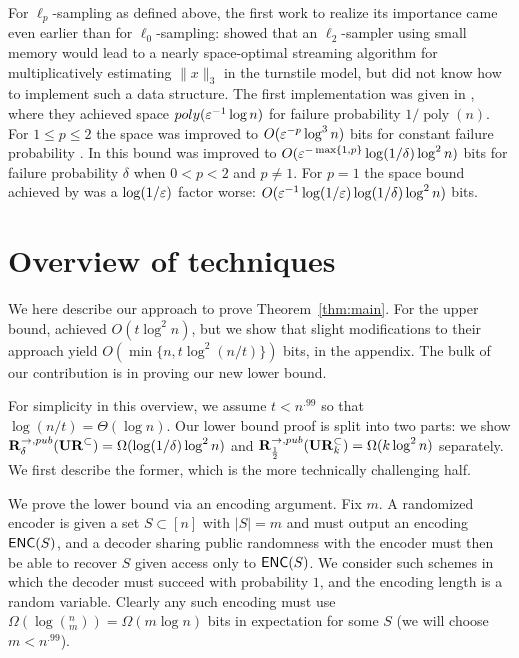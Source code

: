 For $\ell_p$-sampling as defined above, the first work to realize its importance came even earlier than for $\ell_0$-sampling: \cite{CoppersmithK04} showed that an $\ell_2$-sampler using small memory would lead to a nearly space-optimal streaming algorithm for multiplicatively estimating $\|x\|_3$ in the turnstile model, but did not know how to implement such a data structure. The first implementation was given in \cite{MonemizadehW10}, where they achieved space $\mathop{poly}(\varepsilon^{-1}\log n)$ for failure probability $1/\mathop{poly}(n)$. For $1\le p\le 2$ the space was improved to $O(\varepsilon^{-p}\log^3 n)$ bits for constant failure probability \cite{AndoniKO11}. In \cite{JowhariST11} this bound was improved to $O(\varepsilon^{-\max\{1,p\}}\log(1/\delta)\log^2 n)$ bits for failure probability $\delta$ when $0<p<2$ and $p\neq 1$. For $p=1$ the space bound achieved by \cite{JowhariST11} was a $\log(1/\varepsilon)$ factor worse: $O(\varepsilon^{-1}\log(1/\varepsilon)\log(1/\delta)\log^2 n)$ bits.


\section{Overview of techniques}
We here describe our approach to prove Theorem~\ref{thm:main}. For the upper bound, \cite{JowhariST11} achieved $O(t\log^2n)$, but we show that slight modifications to their approach yield $O(\min\{n,t\log^2(n/t)\})$ bits, in the appendix. The bulk of our contribution is in proving our new lower bound.

For simplicity in this overview, we assume $t < n^{.99}$ so that $\log(n/t) = \Theta(\log n)$. Our lower bound proof is split into two parts: we show $\mathbf{R}^{\rightarrow,pub}_\delta(\mathbf{UR}^\subset) = \Omega(\log(1/\delta)\log^2 n)$ and $\mathbf{R}^{\rightarrow,pub}_{\frac 12}(\mathbf{UR}_k^\subset)=\Omega(k\log^2n)$ separately. We first describe the former, which is the more technically challenging half.

We prove the lower bound via an encoding argument. Fix $m$. A randomized encoder is given a set $S\subset[n]$ with $|S| = m$ and must output an encoding $\textsf{ENC}(S)$, and a decoder sharing public randomness with the encoder must then be able to recover $S$ given access only to $\textsf{ENC}(S)$. We consider such schemes in which the decoder must succeed with probability $1$, and the encoding length is a random variable. Clearly any such encoding must use $\Omega(\log(^n_m)) = \Omega(m\log n)$ bits in expectation for some $S$ (we will choose $m < n^{.99}$).

